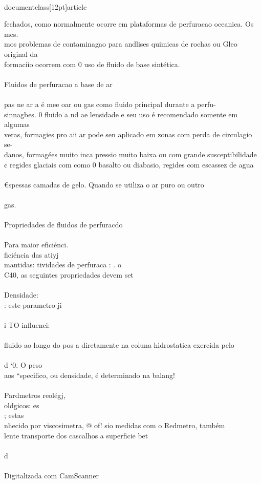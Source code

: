 \\documentclass[12pt]{article}
\begin{document}
fechados, como normalmente ocorre em plataformas de perfuracao oceanica. Os mes.\\
mos problemas de contaminagao para andlises quimicas de rochas ou Gleo original da\\
formaciio ocorrem com 0 uso de fluido de base sintética.\\
\\
Fluidos de perfuracao a base de ar\\
\\
pas ne ar a é mee oar ou gas como fluido principal durante a perfu-\\
sinnagbes. 0 fluido a nd ae lensidade e seu uso é recomendado somente em algumas\\
veras, formagies pro aii ar pode sen aplicado em zonas com perda de circulagio se-\\
danos, formagées muito inca pressio muito baixa ou com grande susceptibilidade\\
¢ regides glaciais com como 0 basalto ou diabasio, regides com escassez de agua\\
\\
€spessas camadas de gelo. Quando se utiliza o ar puro ou outro\\
\\
gas.\\
\\
Propriedades de fluidos de perfuracdo\\
\\
Para maior eficiénci.\\
ficiéncia das atiyj\\
mantidas: tividades de perfuraca : . o\\
C40, as seguintes propriedades devem set\\
\\
Densidade:\\
: este parametro ji\\
\\
i TO influenci:\\
\\
fluido ao longo do pos a diretamente na coluna hidrostatica exercida pelo\\
\\
d ‘0. O peso\\
aos “specifico, ou densidade, é determinado na balang!\\
\\
Pardmetros reolégj,\\
oldgicos: es\\
; estas\\
nhecido por viscosimetra, @ of! sio medidas com o Redmetro, também\\
lente transporte dos cascalhos a superficie bet\\
\\
d\\
\\
Digitalizada com CamScanner\\
\end{document}
